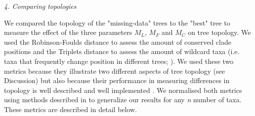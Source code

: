 \documentclass[12pt,letterpaper]{article}
\renewcommand{\subsection}[1]{%
\bigskip
\begin{center}
\begin{large}
\normalfont\itshape #1
\end{large}
\end{center}}
\begin{document}
\subsection{4. Comparing topologies}
We compared the topology of the "missing-data" trees to the "best" tree to measure the effect of the three parameters $M_{L}$, $M_{F}$ and $M_{C}$ on tree topology. We used the Robinson-Foulds distance \citep{RF1981} to assess the amount of conserved clade positions and the Triplets distance \citep{dobson1975triplets} to assess the amount of wildcard taxa (i.e. taxa that frequently change position in different trees; \citealt{kearneyfragmentary2002}).
We used these two metrics because they illustrate two different aspects of tree topology (see Discussion) but also because their performance in measuring differences in topology is well described \citep{Kuhner04112014} and well implemented \citep{Bogdanowicz2012}.
We normalised both metrics using methods described in \citet{Bogdanowicz2012} to generalize our results for any \textit{n} number of taxa. These metrics are described in detail below.
\end{document}

